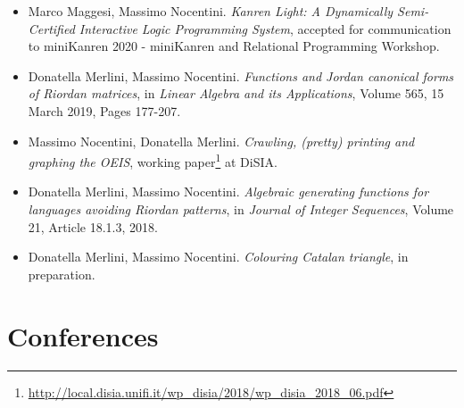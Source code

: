 \documentclass[a4paper]{article} %
\begin{document}
    \begin{itemize}
	
        \item Marco Maggesi, Massimo Nocentini. \emph{Kanren Light: A
		    Dynamically Semi-Certified Interactive Logic Programming
		    System}, accepted for communication to miniKanren 2020 -
		    miniKanren and Relational Programming Workshop.

        \item Donatella Merlini, Massimo Nocentini. \emph{Functions and Jordan canonical forms of Riordan matrices},
        in \textit{Linear Algebra and its Applications}, Volume 565, 15 March 2019, Pages 177-207.

        \item Massimo Nocentini, Donatella Merlini. \emph{Crawling, (pretty) printing and graphing the OEIS}, 
        working paper\footnote{\url{http://local.disia.unifi.it/wp_disia/2018/wp_disia_2018_06.pdf}} at DiSIA.

        \item Donatella Merlini, Massimo Nocentini. \emph{Algebraic generating functions for languages
            avoiding Riordan patterns}, in \textit{Journal of Integer Sequences}, Volume 21, Article 18.1.3, 2018.

        \item Donatella Merlini, Massimo Nocentini. \emph{Colouring Catalan triangle}, in preparation.

    \end{itemize}
    
    \section{Conferences}
\end{document}
